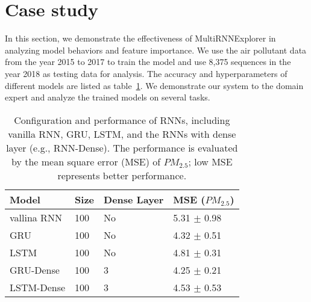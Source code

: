 \section{Case study}

In this section, we demonstrate the effectiveness of MultiRNNExplorer in analyzing model behaviors and feature importance. 
We use the air pollutant data from the year 2015 to 2017 to train the model and use 8,375 sequences in the year 2018 as testing data for analysis. 
The accuracy and hyperparameters of different models are listed as table~\ref{table:model_configuration}. 
We demonstrate our system to the domain expert and analyze the trained models on several tasks.

\begin{table}[h!]
\centering
\caption{Configuration and performance of RNNs, including vanilla RNN, GRU, LSTM, and the RNNs with dense layer (e.g., RNN-Dense). The performance is evaluated by the mean square error (MSE) of $PM_{2.5}$; low MSE represents better performance.}
\begin{tabular}{p{2cm}|p{1cm}|p{2cm}|p{2cm}} 
 \hline
 Model & Size & Dense Layer & MSE ($PM_{2.5}$) \\ [0.5ex] 
 \hline
    vallina RNN&100&No&5.31 $\pm$ 0.98 \\
    GRU&100&No&4.32 $\pm$ 0.51\\
    LSTM&100&No&4.81 $\pm$ 0.31\\
    GRU-Dense&100&3&4.25 $\pm$ 0.21\\
    LSTM-Dense&100&3&4.53 $\pm$ 0.53\\
\hline
\end{tabular}
\label{table:model_configuration}
\end{table}















